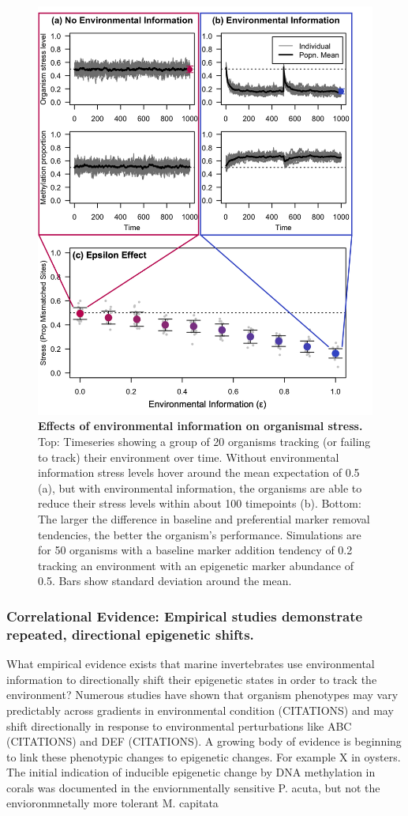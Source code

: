 \documentclass{article}
\begin{document}
\begin{figure}
    \centering
    \includegraphics[width=.8\textwidth]{Figures/Fig_EnvironmentalFeedback_Consolidated.png}
    \caption{\textbf{Effects of environmental information on organismal stress.} Top: Timeseries showing a group of 20 organisms tracking (or failing to track) their environment over time. Without environmental information stress levels hover around the mean expectation of 0.5 (a), but with environmental information, the organisms are able to reduce their stress levels within about 100 timepoints (b). Bottom: The larger the difference in baseline and preferential marker removal tendencies, the better the organism's performance. Simulations are for 50 organisms with a baseline marker addition tendency of 0.2 tracking an environment with an epigenetic marker abundance of 0.5. Bars show standard deviation around the mean.}
    \label{fig:envfeedback}
\end{figure}

\subsubsection{Correlational Evidence: Empirical studies demonstrate repeated, directional epigenetic shifts.}

What empirical evidence exists that marine invertebrates use environmental information to directionally shift their epigenetic states in order to track the environment? Numerous studies have shown that organism phenotypes may vary predictably across gradients in environmental condition (CITATIONS) and may shift directionally in response to environmental perturbations like ABC (CITATIONS) and DEF (CITATIONS). A growing body of evidence is beginning to link these phenotypic changes to epigenetic changes.
For example X in oysters. The initial indication of inducible epigenetic change by DNA methylation in corals was documented in the enviornmentally sensitive P. acuta, but not the envioronmnetally more tolerant M. capitata \cite{putnam2016ocean}
\end{document}

